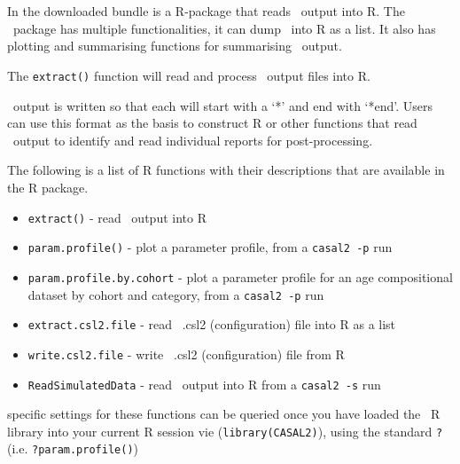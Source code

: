 \section{ \label{sec:post-processing}}

In the downloaded bundle is a R-package that reads \CNAME\ output into R. The \CNAME\ package has multiple functionalities, it can dump \CNAME\ into R as a list. It also has plotting and summarising functions for summarising \CNAME\ output.

The \texttt{extract()} function will read and process \CNAME\ output files into R. 

\CNAME\ output is written so that each  will start with a `*' and end with `*end'. Users can use this format as the basis to construct R or other functions that read \CNAME\ output to identify and read individual reports for post-processing.


The following is a list of R functions with their descriptions that are available in the R package.

\begin{itemize}
	\item \texttt{extract()} - read \CNAME\ output into R
	\item \texttt{param.profile()} - plot a parameter profile, from a \texttt{casal2 -p} run
	\item \texttt{param.profile.by.cohort} - plot a parameter profile for an age compositional dataset by cohort and category, from a \texttt{casal2 -p} run
	\item \texttt{extract.csl2.file} - read \CNAME\ .csl2 (configuration) file into R as a list
	\item \texttt{write.csl2.file} - write \CNAME\ .csl2 (configuration) file from R
	\item \texttt{ReadSimulatedData} - read \CNAME\ output into R from a \texttt{casal2 -s} run		
\end{itemize}


specific settings for these functions can be queried once you have loaded the \CNAME\ R library into your current R session vie (\texttt{library(CASAL2)}), using the standard \texttt{?} (i.e. \texttt{?param.profile()})